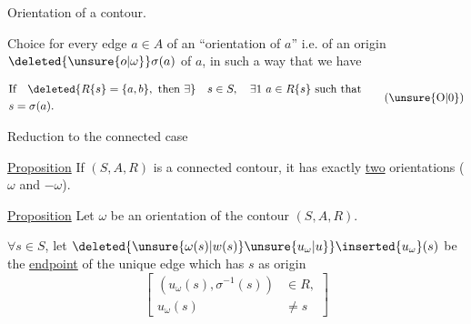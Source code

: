 Orientation of a contour.

Choice for every edge $a\in A$ of an ``orientation of $a$'' i.e. of an origin $\deleted{\unsure{o|\omega}}\sigma(a)$ of $a$, in such a way that we have


\[
\begin{aligned}
&\text{If}\quad \deleted{R\{s\}=\{a,b\},\ \text{then }\exists}\quad s\in S,\quad \exists1\ a\in R\{s\}\ \text{such that}\\
&s=\sigma(a).
\end{aligned}\tag*{(\unsure{O|0})}
\]

Reduction to the connected case

\uline{Proposition} If $(S,A,R)$ is a connected contour, it has exactly \uline{two} orientations ($\omega$ and $-\omega$).


 \uline{Proposition} Let $\omega$ be an orientation of the contour $(S,A,R)$.

$\forall s\in S$, let $\deleted{\unsure{\omega(s)|w(s)}\unsure{u_{\omega}|u}}\inserted{u_{\omega}}(s)$ be the \uline{endpoint} of the unique edge  which has  $s$ as origin
\[
\left[\begin{aligned}(u_{\omega}(s),\sigma^{-1}(s))&\in R,\\u_{\omega}(s)&\ne s\end{aligned}\right]
\]

